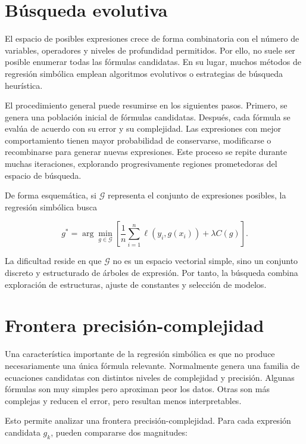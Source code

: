 \section{Búsqueda evolutiva}

El espacio de posibles expresiones crece de forma combinatoria con el número de variables, operadores y niveles de profundidad permitidos. Por ello, no suele ser posible enumerar todas las fórmulas candidatas. En su lugar, muchos métodos de regresión simbólica emplean algoritmos evolutivos o estrategias de búsqueda heurística.

El procedimiento general puede resumirse en los siguientes pasos. Primero, se genera una población inicial de fórmulas candidatas. Después, cada fórmula se evalúa de acuerdo con su error y su complejidad. Las expresiones con mejor comportamiento tienen mayor probabilidad de conservarse, modificarse o recombinarse para generar nuevas expresiones. Este proceso se repite durante muchas iteraciones, explorando progresivamente regiones prometedoras del espacio de búsqueda.

De forma esquemática, si \(\mathcal{G}\) representa el conjunto de expresiones posibles, la regresión simbólica busca

\begin{equation}
g^{*}
=
\arg\min_{g \in \mathcal{G}}
\left[
\frac{1}{n}
\sum_{i=1}^{n}
\ell
\left(
y_i,
g(x_i)
\right)
+
\lambda C(g)
\right].
\label{eq:symbolic-argmin}
\end{equation}

La dificultad reside en que \(\mathcal{G}\) no es un espacio vectorial simple, sino un conjunto discreto y estructurado de árboles de expresión. Por tanto, la búsqueda combina exploración de estructuras, ajuste de constantes y selección de modelos.

\section{Frontera precisión-complejidad}

Una característica importante de la regresión simbólica es que no produce necesariamente una única fórmula relevante. Normalmente genera una familia de ecuaciones candidatas con distintos niveles de complejidad y precisión. Algunas fórmulas son muy simples pero aproximan peor los datos. Otras son más complejas y reducen el error, pero resultan menos interpretables.

Esto permite analizar una frontera precisión-complejidad. Para cada expresión candidata \(g_k\), pueden compararse dos magnitudes:


